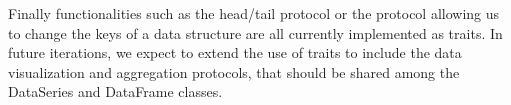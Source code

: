 \documentclass[sigplan]{acmart}
\begin{document}
Finally functionalities such as the head/tail protocol or the protocol allowing us to change the keys of a data structure are all currently implemented as traits. In future iterations, we expect to extend the use of traits to include the data visualization and aggregation protocols, that should be shared among the DataSeries and DataFrame classes. 
%
%

\end{document}

